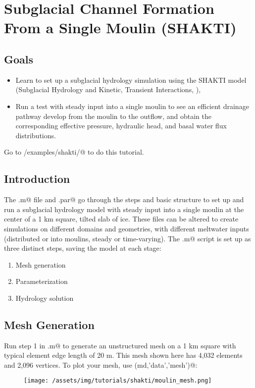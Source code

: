 \section{Subglacial Channel Formation From a Single Moulin (SHAKTI)}
\subsection{Goals} %
\begin{itemize}
	\item Learn to set up a subglacial hydrology simulation using the SHAKTI model (Subglacial Hydrology and Kinetic, Transient Interactions, \cite{Sommers2018}),
	\item Run a test with steady input into a single moulin to see an efficient drainage pathway develop from the moulin to the outflow, and obtain the corresponding effective pressure, hydraulic head, and basal water flux distributions.
\end{itemize} 

Go to \verb@trunk/examples/shakti/@ to do this tutorial.
\subsection{Introduction}
The \verb@runme.m@ file and \verb@moulin.par@ go through the steps and basic structure to set up and run a subglacial hydrology model with steady input into a single moulin at the center of a 1 km square, tilted slab of ice. These files can be altered to create simulations on different domains and geometries, with different meltwater inputs (distributed or into moulins, steady or time-varying). The \verb@runme.m@ script is set up as three distinct steps, saving the model at each stage:
\begin{enumerate}
	\item Mesh generation
	\item Parameterization
	\item Hydrology solution
\end{enumerate}

\subsection{Mesh Generation}
Run step 1 in \verb@runme.m@ to generate an unstructured mesh on a 1 km square with typical element edge length of 20 m. This mesh shown here has 4,032 elements and 2,096 vertices. To plot your mesh, use \verb@plotmodel(md,'data','mesh')@:
\begin{figure}[H]
	\begin{center}
		\texttt{[image: /assets/img/tutorials/shakti/moulin\_mesh.png]}
	\end{center}
\end{figure}


